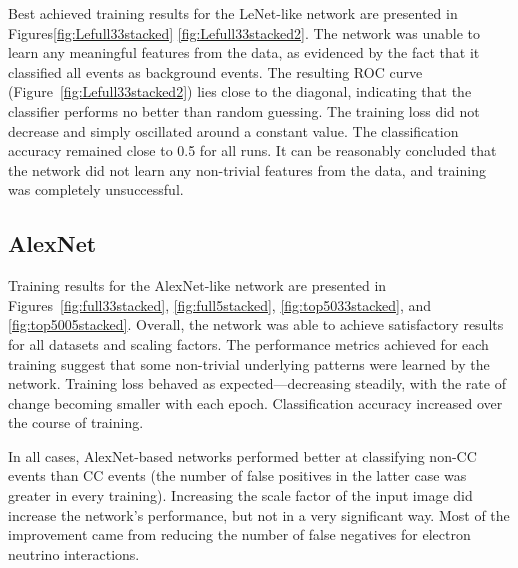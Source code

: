 \documentclass{pracalicmgr}
\begin{document}

Best achieved training results for the LeNet-like network are presented in Figures\ref{fig:Lefull33stacked} \ref{fig:Lefull33stacked2}. The network was unable to learn any meaningful features from the data, as evidenced by the fact that it classified all events as background events. The resulting ROC curve (Figure~\ref{fig:Lefull33stacked2}) lies close to the diagonal, indicating that the classifier performs no better than random guessing. The training loss did not decrease and simply oscillated around a constant value. The classification accuracy remained close to 0.5 for all runs. It can be reasonably concluded that the network did not learn any non-trivial features from the data, and training was completely unsuccessful.

\subsection{AlexNet}

Training results for the AlexNet-like network are presented in Figures~\ref{fig:full33stacked}, \ref{fig:full5stacked}, \ref{fig:top5033stacked}, and \ref{fig:top5005stacked}. Overall, the network was able to achieve satisfactory results for all datasets and scaling factors. The performance metrics achieved for each training suggest that some non-trivial underlying patterns were learned by the network. Training loss behaved as expected—decreasing steadily, with the rate of change becoming smaller with each epoch. Classification accuracy increased over the course of training.

In all cases, AlexNet-based networks performed better at classifying non-CC events than CC events (the number of false positives in the latter case was greater in every training). Increasing the scale factor of the input image did increase the network's performance, but not in a very significant way. Most of the improvement came from reducing the number of false negatives for electron neutrino interactions.
\end{document}
